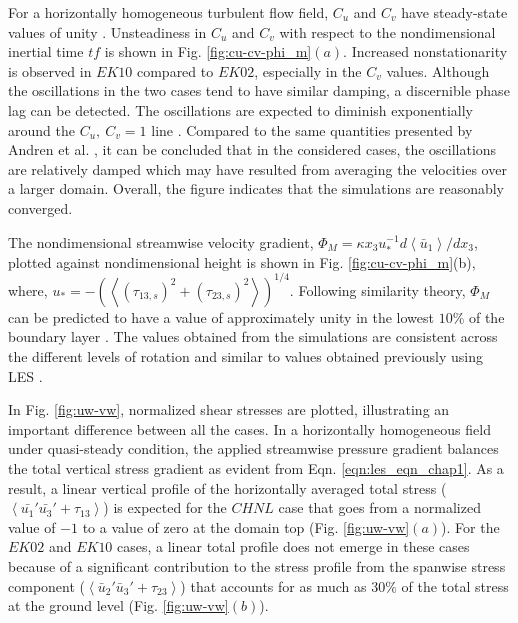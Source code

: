 \noindent For a horizontally homogeneous turbulent flow field, $C_u$ and $C_v$ have steady-state values of unity  \cite{book-garrat-blm}. Unsteadiness in $C_u$ and $C_v$ with respect to the nondimensional inertial time $tf$ is shown in Fig.  \ref{fig:cu-cv-phi_m}$(a)$. Increased nonstationarity is observed in $EK10$ compared to $EK02$, especially in the $C_v$ values. Although the oscillations in the two cases tend to have similar damping, a discernible phase lag can be detected. The oscillations are expected to diminish  exponentially around the  $C_{u},\ C_{v}=1$ line \cite{book-garrat-blm}. Compared to the same quantities presented by Andren et al.  \cite{andren_brown_qjrm_94}, it can be concluded that in the considered cases, the oscillations are relatively damped which may have resulted from averaging the velocities over a larger domain. Overall, the figure indicates that the simulations are reasonably converged. 

The nondimensional streamwise velocity gradient, $\Phi_M=\kappa x_3 u_*^{-1} d\left < \bar{u}_1 \right >/dx_3$, plotted against nondimensional height is shown in Fig. \ref{fig:cu-cv-phi_m}(b), where, $u_*= -(\left < (\tau_{13,s})^2 + ( \tau_{23,s})^2\right >)^{1/4}$. Following similarity theory, $\Phi_M$ can be predicted to have a value of approximately unity in the lowest $10\%$ of the boundary layer \cite{book-garrat-blm, stoll_blm_2006}. The values obtained from the simulations are consistent across the different levels of rotation and similar to values obtained previously using LES \cite{stoll_blm_2006,Bouzeid_pof_2005,andren_brown_qjrm_94}. 

In Fig. \ref{fig:uw-vw}, normalized shear stresses are plotted, illustrating an important difference between all the cases. In a horizontally homogeneous field under quasi-steady condition, the applied streamwise pressure gradient balances the total vertical stress gradient as evident from Eqn. \ref{eqn:les_eqn_chap1}. As a result, a linear vertical profile of the horizontally averaged total stress ($\left <\bar{u_1}'\bar{u_3}'+\tau_{13} \right>$)  is expected for the $CHNL$ case that goes from a normalized value of $-1$ to a value of zero at the domain top (Fig. \ref{fig:uw-vw}$(a)$). For the $EK02$ and $EK10$ cases, a linear total profile does not emerge in these cases because of a significant contribution to the stress profile from  the spanwise stress component ($\left <\bar{u}_{2}'\bar{u}_{3}'+\tau_{23} \right>$) that accounts for as much as $30\%$ of the total stress at the ground level (Fig. \ref{fig:uw-vw}$(b)$). 

